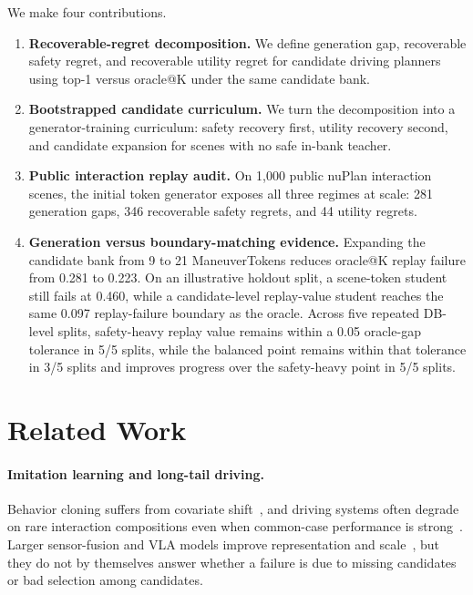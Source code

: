 \documentclass{article}
\begin{document}
We make four contributions.

\begin{enumerate}
  \item \textbf{Recoverable-regret decomposition.} We define generation gap,
    recoverable safety regret, and recoverable utility regret for candidate driving
    planners using top-1 versus oracle@K under the same candidate bank.

  \item \textbf{Bootstrapped candidate curriculum.} We turn the decomposition into a
    generator-training curriculum: safety recovery first, utility recovery second, and
    candidate expansion for scenes with no safe in-bank teacher.

  \item \textbf{Public interaction replay audit.} On 1,000 public nuPlan interaction
    scenes, the initial token generator exposes all three regimes at scale: 281
    generation gaps, 346 recoverable safety regrets, and 44 utility regrets.

  \item \textbf{Generation versus boundary-matching evidence.} Expanding the candidate
    bank from 9 to 21 ManeuverTokens reduces oracle@K replay failure from 0.281 to 0.223.
    On an illustrative holdout split, a scene-token student still fails at 0.460, while a
    candidate-level replay-value student reaches the same 0.097 replay-failure boundary as
    the oracle. Across five repeated DB-level splits, safety-heavy replay value remains
    within a 0.05 oracle-gap tolerance in 5/5 splits, while the balanced point remains
    within that tolerance in 3/5 splits and improves progress over the safety-heavy point
    in 5/5 splits.
\end{enumerate}

\section{Related Work}

\paragraph{Imitation learning and long-tail driving.}
Behavior cloning suffers from covariate shift~\citep{pomerleau1989alvinn,ross2011dagger},
and driving systems often degrade on rare interaction compositions even when common-case
performance is strong~\citep{bansal2018chauffeurnet,hu2023planning}. Larger sensor-fusion
and VLA models improve representation and scale~\citep{chitta2022transfuser,brohan2023rt2},
but they do not by themselves answer whether a failure is due to missing candidates or bad
selection among candidates.
\end{document}
